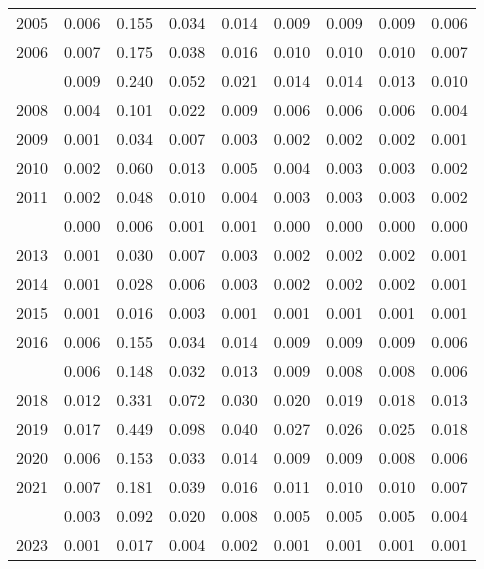 \documentclass[
]{article}
\begin{document}
\begin{longtable}[t]{lrrrrrrrr}
2005 & 0.006 & 0.155 & 0.034 & 0.014 & 0.009 & 0.009 & 0.009 & 0.006\\
2006 & 0.007 & 0.175 & 0.038 & 0.016 & 0.010 & 0.010 & 0.010 & 0.007\\
\addlinespace
2007 & 0.009 & 0.240 & 0.052 & 0.021 & 0.014 & 0.014 & 0.013 & 0.010\\
2008 & 0.004 & 0.101 & 0.022 & 0.009 & 0.006 & 0.006 & 0.006 & 0.004\\
2009 & 0.001 & 0.034 & 0.007 & 0.003 & 0.002 & 0.002 & 0.002 & 0.001\\
2010 & 0.002 & 0.060 & 0.013 & 0.005 & 0.004 & 0.003 & 0.003 & 0.002\\
2011 & 0.002 & 0.048 & 0.010 & 0.004 & 0.003 & 0.003 & 0.003 & 0.002\\
\addlinespace
2012 & 0.000 & 0.006 & 0.001 & 0.001 & 0.000 & 0.000 & 0.000 & 0.000\\
2013 & 0.001 & 0.030 & 0.007 & 0.003 & 0.002 & 0.002 & 0.002 & 0.001\\
2014 & 0.001 & 0.028 & 0.006 & 0.003 & 0.002 & 0.002 & 0.002 & 0.001\\
2015 & 0.001 & 0.016 & 0.003 & 0.001 & 0.001 & 0.001 & 0.001 & 0.001\\
2016 & 0.006 & 0.155 & 0.034 & 0.014 & 0.009 & 0.009 & 0.009 & 0.006\\
\addlinespace
2017 & 0.006 & 0.148 & 0.032 & 0.013 & 0.009 & 0.008 & 0.008 & 0.006\\
2018 & 0.012 & 0.331 & 0.072 & 0.030 & 0.020 & 0.019 & 0.018 & 0.013\\
2019 & 0.017 & 0.449 & 0.098 & 0.040 & 0.027 & 0.026 & 0.025 & 0.018\\
2020 & 0.006 & 0.153 & 0.033 & 0.014 & 0.009 & 0.009 & 0.008 & 0.006\\
2021 & 0.007 & 0.181 & 0.039 & 0.016 & 0.011 & 0.010 & 0.010 & 0.007\\
\addlinespace
2022 & 0.003 & 0.092 & 0.020 & 0.008 & 0.005 & 0.005 & 0.005 & 0.004\\
2023 & 0.001 & 0.017 & 0.004 & 0.002 & 0.001 & 0.001 & 0.001 & 0.001\\*
\end{longtable}
\end{document}
